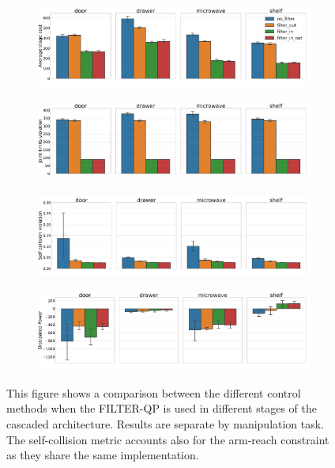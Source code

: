 \begin{figure}[t]
\centering
\hspace*{-0.5cm} 
\begin{subfigure}{0.9\columnwidth}
    \includegraphics[width=\linewidth]{figures/methods_comparison/average_stage_cost.pdf}
\end{subfigure}%
\hfill
\hspace*{-0.5cm} 
\begin{subfigure}{0.9\columnwidth}
    \includegraphics[width=\linewidth]{figures/methods_comparison/joint_limits.pdf}
\end{subfigure}%
\hfill
\hspace*{-0.5cm} 
\begin{subfigure}{0.9\columnwidth}
    \includegraphics[width=\linewidth]{figures/methods_comparison/self_collision.pdf}
\end{subfigure}
\hspace*{-0.5cm} 
\begin{subfigure}{0.9\columnwidth}
    \includegraphics[width=\linewidth]{figures/methods_comparison/dissipated_power.pdf}
\end{subfigure}
\hfill
\caption{This figure shows a comparison between the different control methods when the FILTER-QP is used in different stages of the cascaded architecture. Results are separate by manipulation task. The self-collision metric accounts also for the arm-reach constraint as they share the same implementation.}\label{fig:methods_comparison}
\end{figure}

